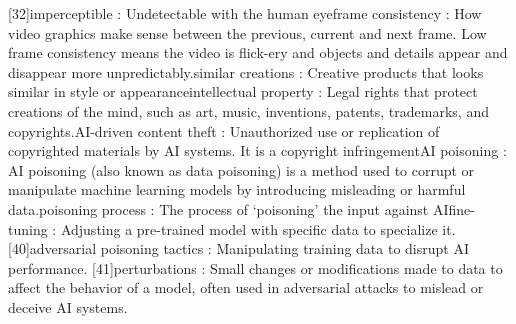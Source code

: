 [32]imperceptible : Undetectable with the human eye\newline
[33]frame consistency : How video graphics make sense between the previous, current and next frame. Low frame consistency means the video is flick-ery and objects and details appear and disappear more unpredictably.\newline
[34]similar creations : Creative products that looks similar in style or appearance\newline
[35]intellectual property : Legal rights that protect creations of the mind, such as art, music, inventions, patents, trademarks, and copyrights.\newline
[36]AI-driven content theft : Unauthorized use or replication of copyrighted materials by AI systems. It is a copyright infringement\newline
[37]AI poisoning : AI poisoning (also known as data poisoning) is a method used to corrupt or manipulate machine learning models by introducing misleading or harmful data.\newline
[38]poisoning process : The process of ‘poisoning’ the input against AI\newline
[39]fine-tuning : Adjusting a pre-trained model with specific data to specialize it.
[40]adversarial poisoning tactics : Manipulating training data to disrupt AI performance.
[41]perturbations : Small changes or modifications made to data to affect the behavior of a model, often used in adversarial attacks to mislead or deceive AI systems.
